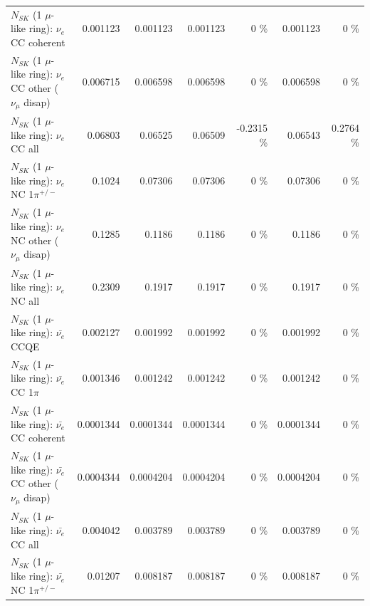 \begin{table}
\begin{tabular}{| l | r | r | r  r | r  r |}
                               $N_{SK}$ (1 $\mu$-like ring): $\nu_e$ CC coherent &        0.001123 &        0.001123 &        0.001123 &        0 \%  &        0.001123 &        0 \%  \\ 
                $N_{SK}$ (1 $\mu$-like ring): $\nu_e$ CC other ($\nu_\mu$ disap) &        0.006715 &        0.006598 &        0.006598 &        0 \%  &        0.006598 &        0 \%  \\ 
                                  $N_{SK}$ (1 $\mu$-like ring): $\nu_{e}$ CC all &         0.06803 &         0.06525 &         0.06509 &  -0.2315 \%  &         0.06543 &   0.2764 \%  \\ 
\hline
                           $N_{SK}$ (1 $\mu$-like ring): $\nu_e$ NC 1$\pi^{+/-}$ &          0.1024 &         0.07306 &         0.07306 &        0 \%  &         0.07306 &        0 \%  \\ 
                $N_{SK}$ (1 $\mu$-like ring): $\nu_e$ NC other ($\nu_\mu$ disap) &          0.1285 &          0.1186 &          0.1186 &        0 \%  &          0.1186 &        0 \%  \\ 
                                  $N_{SK}$ (1 $\mu$-like ring): $\nu_{e}$ NC all &          0.2309 &          0.1917 &          0.1917 &        0 \%  &          0.1917 &        0 \%  \\ 
\hline
\hline
\hline
                                $N_{SK}$ (1 $\mu$-like ring): $\bar{\nu_e}$ CCQE &        0.002127 &        0.001992 &        0.001992 &        0 \%  &        0.001992 &        0 \%  \\ 
                           $N_{SK}$ (1 $\mu$-like ring): $\bar{\nu_e}$ CC 1$\pi$ &        0.001346 &        0.001242 &        0.001242 &        0 \%  &        0.001242 &        0 \%  \\ 
                         $N_{SK}$ (1 $\mu$-like ring): $\bar{\nu_e}$ CC coherent &       0.0001344 &       0.0001344 &       0.0001344 &        0 \%  &       0.0001344 &        0 \%  \\ 
          $N_{SK}$ (1 $\mu$-like ring): $\bar{\nu_e}$ CC other ($\nu_\mu$ disap) &       0.0004344 &       0.0004204 &       0.0004204 &        0 \%  &       0.0004204 &        0 \%  \\ 
                            $N_{SK}$ (1 $\mu$-like ring): $\bar{\nu_{e}}$ CC all &        0.004042 &        0.003789 &        0.003789 &        0 \%  &        0.003789 &        0 \%  \\ 
\hline
                     $N_{SK}$ (1 $\mu$-like ring): $\bar{\nu_e}$ NC 1$\pi^{+/-}$ &         0.01207 &        0.008187 &        0.008187 &        0 \%  &        0.008187 &        0 \%  \\ 

\end{tabular}
\end{table}
